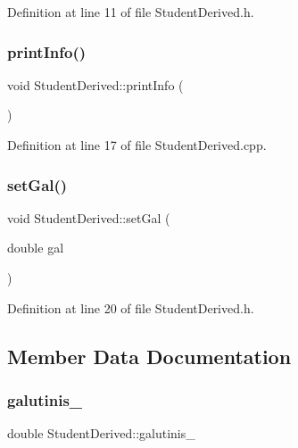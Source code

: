 Definition at line 11 of file Student\+Derived.\+h.

\mbox{\label{class_student_derived_a7c84acecf565c70e2a6d4bfd1c60f7c1}} 
\subsubsection{\texorpdfstring{printInfo()}{printInfo()}}
{\footnotesize\ttfamily void Student\+Derived\+::print\+Info (\begin{DoxyParamCaption}{ }\end{DoxyParamCaption})}



Definition at line 17 of file Student\+Derived.\+cpp.

\mbox{\label{class_student_derived_a62c621c84c78a94a6e8ad53e03e9c3ef}} 
\subsubsection{\texorpdfstring{setGal()}{setGal()}}
{\footnotesize\ttfamily void Student\+Derived\+::set\+Gal (\begin{DoxyParamCaption}\item[{double}]{gal }\end{DoxyParamCaption})\hspace{0.3cm}{\ttfamily [inline]}}



Definition at line 20 of file Student\+Derived.\+h.



\subsection{Member Data Documentation}
\mbox{\label{class_student_derived_aba98ad07d71e74bc0c0c8e5be5d2ff81}} 
\subsubsection{\texorpdfstring{galutinis\_}{galutinis\_}}
{\footnotesize\ttfamily double Student\+Derived\+::galutinis\+\_\+\hspace{0.3cm}{\ttfamily [private]}}



